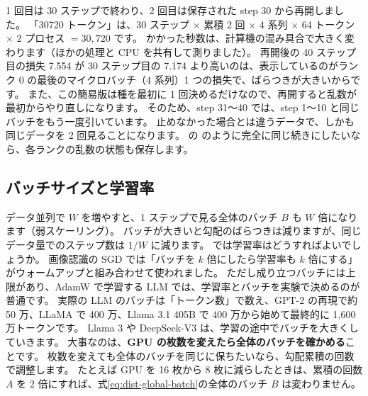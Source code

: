 
1 回目は 30 ステップで終わり、2 回目は保存された step 30 から再開しました。
「30720 トークン」は、30 ステップ $\times$ 累積 2 回 $\times$ 4 系列 $\times$ 64 トークン $\times$ 2 プロセス $=30{,}720$ です。
かかった秒数は、計算機の混み具合で大きく変わります（ほかの処理と CPU を共有して測りました）。
再開後の 40 ステップ目の損失 7.554 が 30 ステップ目の 7.174 より高いのは、表示しているのがランク 0 の最後のマイクロバッチ（4 系列）1 つの損失で、ばらつきが大きいからです。
また、この簡易版は種を最初に 1 回決めるだけなので、再開すると乱数が最初からやり直しになります。
そのため、step 31〜40 では、step 1〜10 と同じバッチをもう一度引いています。
止めなかった場合とは違うデータで、しかも同じデータを 2 回見ることになります。
の  のように完全に同じ続きにしたいなら、各ランクの乱数の状態も保存します。

\subsection*{バッチサイズと学習率}

データ並列で $W$ を増やすと、1 ステップで見る全体のバッチ $B$ も $W$ 倍になります（弱スケーリング）。
バッチが大きいと勾配のばらつきは減りますが、同じデータ量でのステップ数は $1/W$ に減ります。
では学習率はどうすればよいでしょうか。
画像認識の SGD では「バッチを $k$ 倍にしたら学習率も $k$ 倍にする」がウォームアップと組み合わせて使われました\cite{goyal2017accurate}。
ただし成り立つバッチには上限があり、AdamW で学習する LLM では、学習率とバッチを実験で決めるのが普通です。
実際の LLM のバッチは「トークン数」で数え、GPT-2 の再現で約 50 万、LLaMA で 400 万、Llama 3.1 405B で 400 万から始めて最終的に 1,600 万トークンです。
Llama 3 や DeepSeek-V3 は、学習の途中でバッチを大きくしていきます\cite{dubey2024llama3,liu2024deepseekv3}。
大事なのは、\textbf{GPU の枚数を変えたら全体のバッチを確かめる}ことです。
枚数を変えても全体のバッチを同じに保ちたいなら、勾配累積の回数で調整します。
たとえば GPU を 16 枚から 8 枚に減らしたときは、累積の回数 $A$ を 2 倍にすれば、式\eqref{eq:dist-global-batch}の全体のバッチ $B$ は変わりません。

